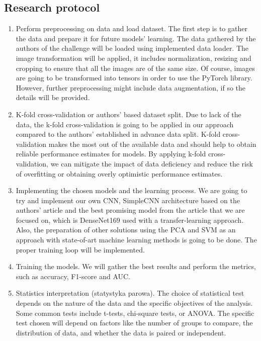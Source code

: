 \documentclass[runningheads]{llncs}
\begin{document}
\subsection{Research protocol}
\begin{enumerate}
  \item Perform preprocessing on data and load dataset.
  \newline
  The first step is to gather the data and prepare it for future models' learning. The data gathered by the authors of the challenge will be loaded using implemented data loader. The image transformation will be applied, it includes normalization, resizing and cropping to ensure that all the images are of the same size. Of course, images are going to be transformed into tensors in order to use the PyTorch library. However, further preprocessing might include data augmentation, if so the details will be provided.
  \item K-fold cross-validation or authors' based dataset split.
  \newline
  Due to lack of the data, the k-fold cross-validation is going to be applied in our approach compared to the authors' established in advance data split. K-fold cross-validation makes the most out of the available data and should help to obtain reliable performance estimates for models. By applying k-fold cross-validation, we can mitigate the impact of data deficiency and reduce the risk of overfitting or obtaining overly optimistic performance estimates. 
  \item Implementing the chosen models and the learning process.
  \newline
  We are going to try and implement our own CNN, SimpleCNN architecture based on the authors' article and the best promising model from the article that we are focused on, which is DenseNet169 used with a transfer-learning approach. Also, the preparation of other solutions using the PCA and SVM as an approach with state-of-art machine learning methods is going to be done. The proper training loop will be implemented.
  \item Training the models.
  \newline
  We will gather the best results and perform the metrics, such as accuracy, F1-score and AUC.
  \item Statistics interpretation (statystyka parowa).
  \newline
  The choice of statistical test depends on the nature of the data and the specific objectives of the analysis. Some common tests include t-tests, chi-square tests, or ANOVA. The specific test chosen will depend on factors like the number of groups to compare, the distribution of data, and whether the data is paired or independent.

\end{enumerate}
\end{document}
